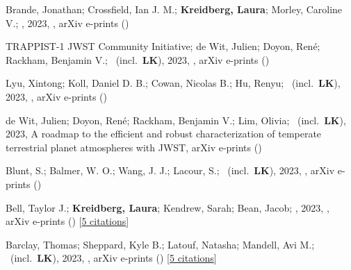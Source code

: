 \item[{\color{numcolor}\scriptsize20}] Brande, Jonathan; Crossfield, Ian J. M.; \textbf{Kreidberg, Laura}; Morley, Caroline V.; \etal, 2023, , arXiv e-prints ()

\item[{\color{numcolor}\scriptsize19}] TRAPPIST-1 JWST Community Initiative; de Wit, Julien; Doyon, Ren{\'e}; Rackham, Benjamin V.; \etal\ (incl.\ \textbf{LK}), 2023, , arXiv e-prints ()

\item[{\color{numcolor}\scriptsize18}] Lyu, Xintong; Koll, Daniel D. B.; Cowan, Nicolas B.; Hu, Renyu; \etal\ (incl.\ \textbf{LK}), 2023, , arXiv e-prints ()

\item[{\color{numcolor}\scriptsize17}] de Wit, Julien; Doyon, Ren{\'e}; Rackham, Benjamin V.; Lim, Olivia; \etal\ (incl.\ \textbf{LK}), 2023, A roadmap to the efficient and robust characterization of temperate terrestrial planet atmospheres with JWST, arXiv e-prints ()

\item[{\color{numcolor}\scriptsize16}] Blunt, S.; Balmer, W. O.; Wang, J. J.; Lacour, S.; \etal\ (incl.\ \textbf{LK}), 2023, , arXiv e-prints ()

\item[{\color{numcolor}\scriptsize15}] Bell, Taylor J.; \textbf{Kreidberg, Laura}; Kendrew, Sarah; Bean, Jacob; \etal, 2023, , arXiv e-prints () [\href{https://ui.adsabs.harvard.edu/abs/2023arXiv230106350B}{5 citations}]

\item[{\color{numcolor}\scriptsize14}] Barclay, Thomas; Sheppard, Kyle B.; Latouf, Natasha; Mandell, Avi M.; \etal\ (incl.\ \textbf{LK}), 2023, , arXiv e-prints () [\href{https://ui.adsabs.harvard.edu/abs/2023arXiv230110866B}{5 citations}]

